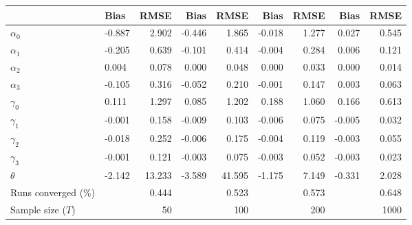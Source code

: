 
\begin{tabular}[t]{llrrrrrrr}
\toprule
  & Bias & RMSE & Bias & RMSE & Bias & RMSE & Bias & RMSE\\
\midrule
$\alpha_{0}$ & -0.887 & 2.902 & -0.446 & 1.865 & -0.018 & 1.277 & 0.027 & 0.545\\
$\alpha_{1}$ & -0.205 & 0.639 & -0.101 & 0.414 & -0.004 & 0.284 & 0.006 & 0.121\\
$\alpha_{2}$ & 0.004 & 0.078 & 0.000 & 0.048 & 0.000 & 0.033 & 0.000 & 0.014\\
$\alpha_{3}$ & -0.105 & 0.316 & -0.052 & 0.210 & -0.001 & 0.147 & 0.003 & 0.063\\
$\gamma_{0}$ & 0.111 & 1.297 & 0.085 & 1.202 & 0.188 & 1.060 & 0.166 & 0.613\\
$\gamma_{1}$ & -0.001 & 0.158 & -0.009 & 0.103 & -0.006 & 0.075 & -0.005 & 0.032\\
$\gamma_{2}$ & -0.018 & 0.252 & -0.006 & 0.175 & -0.004 & 0.119 & -0.003 & 0.055\\
$\gamma_{3}$ & -0.001 & 0.121 & -0.003 & 0.075 & -0.003 & 0.052 & -0.003 & 0.023\\
$\theta$ & -2.142 & 13.233 & -3.589 & 41.595 & -1.175 & 7.149 & -0.331 & 2.028\\
Runs converged (\%) &  & 0.444 &  & 0.523 &  & 0.573 &  & 0.648\\
Sample size ($T$) &  & 50 &  & 100 &  & 200 &  & 1000\\
\bottomrule
\end{tabular}

